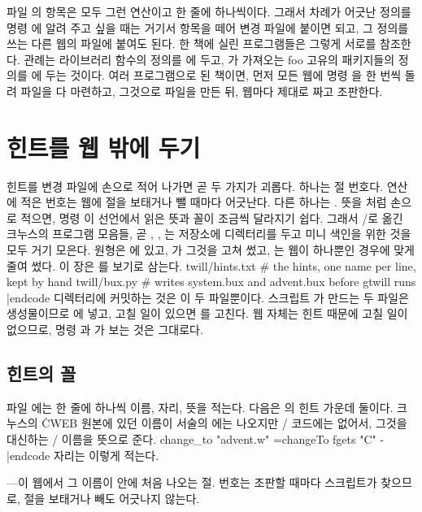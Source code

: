 파일 의 항목은 모두 그런  연산이고 한 줄에 하나씩이다. 그래서
차례가 어긋난 정의를 명령 에 알려 주고 싶을 때는 거기서 항목을 떼어
변경 파일에 붙이면 되고, 그 정의를 쓰는 다른 웹의  파일에 붙여도 된다.
한 책에 실린 프로그램들은 그렇게 서로를 참조한다. 관례는 라이브러리 함수의 정의를
에 두고, 가 가져오는 foo 고유의 패키지들의 정의를
에 두는 것이다. 여러 프로그램으로 된 책이면, 먼저 모든 웹에 명령
을 한 번씩 돌려  파일을 다 마련하고, 그것으로  파일을
만든 뒤, 웹마다 제대로 짜고 조판한다.

\chapter{힌트를 웹 밖에 두기}
\noindent 힌트를 변경 파일에 손으로 적어 나가면 곧 두 가지가 괴롭다. 하나는 절
번호다. 연산 에 적은 번호는 웹에 절을 보태거나 뺄 때마다 어긋난다. 다른
하나는 . 뜻을 처럼 손으로 적으면, 명령 이
선언에서 읽은 뜻과 꼴이 조금씩 달라지기 쉽다. 그래서 \GO/로 옮긴 크누스의 프로그램
모음들, 곧 , , 는 저장소에 
디렉터리를 두고 미니 색인을 위한 것을 모두 거기 모은다. 원형은 에 있고,
가 그것을 고쳐 썼고, 는 웹이 하나뿐인 경우에 맞게 줄여
썼다. 이 장은 를 보기로 삼는다.
\begincode
twill/hints.txt     # the hints, one name per line, kept by hand
twill/bux.py        # writes system.bux and advent.bux before gtwill runs
|endcode
디렉터리에 커밋하는 것은 이 두 파일뿐이다. 스크립트 가 만드는 두
 파일은 생성물이므로 에 넣고, 고칠 일이 있으면
를 고친다. 웹 자체는 힌트 때문에 고칠 일이 없으므로, 명령
과 가 보는 것은 그대로다.

\section{힌트의 꼴}
파일 에는 한 줄에 하나씩 이름, 자리, 뜻을 적는다. 다음은 의
힌트 가운데 둘이다. 크누스의 \.{CWEB} 원본에 있던 이름이 서술의 에는
나오지만 \GO/ 코드에는 없어서, 그것을 대신하는 \GO/ 이름을 뜻으로 준다.
\begincode
change_to "advent.w" =changeTo
fgets "C" -
|endcode
자리는 이렇게 적는다.

\bull \cw{\S}---이 웹에서 그 이름이  안에 처음 나오는 절. 번호는 조판할
때마다 스크립트가 찾으므로, 절을 보태거나 빼도 어긋나지 않는다.

